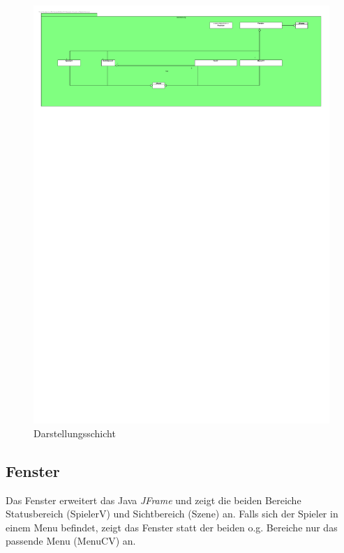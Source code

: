 \
\\
\begin{figure}[h]
	\begin{center}
		\includegraphics[trim=0cm 45cm 0cm 0cm, clip=true, width=16cm]{kapitel/bausteinsicht/darstellung.pdf}
	\end{center}
	\caption{Darstellungsschicht}
	\label{fig:darstellung_uml}
\end{figure}

\subsection{Fenster}
Das Fenster erweitert das Java \textit{JFrame} und zeigt die beiden Bereiche \gls{Statusbereich} 
(SpielerV) und \gls{Sichtbereich} (Szene) an. Falls sich der \gls{Spieler} in einem Menu befindet, 
zeigt das Fenster statt der beiden o.g. Bereiche nur das passende Menu (MenuCV) an.

